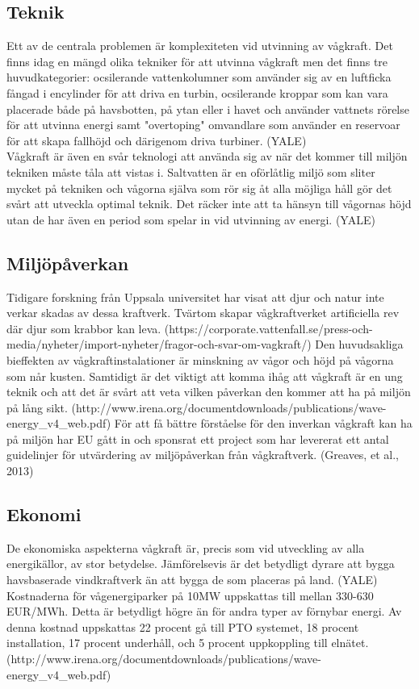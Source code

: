 \documentclass[10pt,a4paper,oneside]{article}
\begin{document}
\subsection{Teknik}
Ett av de centrala problemen är komplexiteten vid utvinning av vågkraft. Det finns idag en mängd olika tekniker för att utvinna vågkraft men det finns tre huvudkategorier:  ocsilerande vattenkolumner som använder sig av en luftficka fångad i encylinder för att driva en turbin, ocsilerande kroppar som kan vara placerade både på havsbotten, på ytan eller i havet och använder vattnets rörelse för att utvinna energi samt "overtoping" omvandlare som använder en reservoar för att skapa fallhöjd och därigenom driva turbiner. (YALE)\\

Vågkraft är även en svår teknologi att använda sig av när det kommer till miljön tekniken måste tåla att vistas i. Saltvatten är en oförlåtlig miljö som sliter mycket på tekniken och vågorna själva som rör sig åt alla möjliga håll gör det svårt att utveckla optimal teknik. Det räcker inte att ta hänsyn till vågornas höjd utan de har även en period som spelar in vid utvinning av energi. (YALE)


\subsection{Miljöpåverkan}
Tidigare forskning från Uppsala universitet har visat att djur och natur inte verkar skadas av dessa kraftverk. Tvärtom skapar vågkraftverket artificiella rev där djur som krabbor kan leva. (https://corporate.vattenfall.se/press-och-media/nyheter/import-nyheter/fragor-och-svar-om-vagkraft/)
Den huvudsakliga bieffekten av vågkraftinstalationer är minskning av vågor och höjd på vågorna som når kusten. Samtidigt är det viktigt att komma ihåg att vågkraft är en ung teknik och att det är svårt att veta vilken påverkan den kommer att ha på miljön på lång sikt. (http://www.irena.org/documentdownloads/publications/wave-energy_v4_web.pdf) För att få bättre förståelse för den inverkan vågkraft kan ha på miljön har EU gått in och sponsrat ett project som har levererat ett antal guidelinjer för utvärdering av miljöpåverkan från vågkraftverk. (Greaves, et al., 2013)

\subsection{Ekonomi}
De ekonomiska aspekterna vågkraft är, precis som vid utveckling av alla energikällor, av stor betydelse. Jämförelsevis är det betydligt dyrare att bygga havsbaserade vindkraftverk än att bygga de som placeras på land. (YALE)
Kostnaderna för vågenergiparker på 10MW uppskattas till mellan 330-630 EUR/MWh. Detta är betydligt högre än för andra typer av förnybar energi. Av denna kostnad uppskattas 22 procent gå till PTO systemet, 18 procent installation, 17 procent underhåll, och 5 procent uppkoppling till elnätet. (http://www.irena.org/documentdownloads/publications/wave-energy_v4_web.pdf)\\
\end{document}
